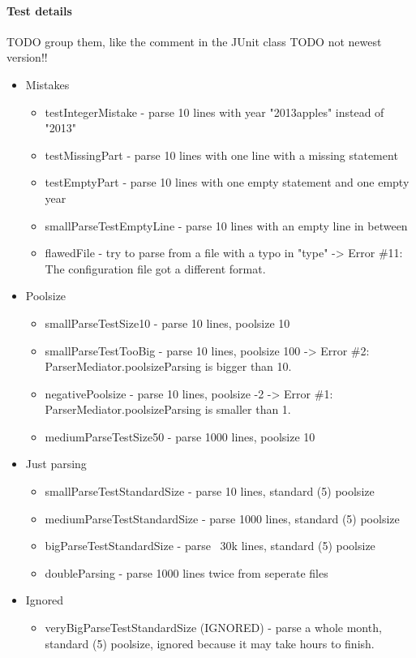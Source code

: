\paragraph{Test details}
TODO group them, like the comment in the JUnit class
TODO not newest version!!
\begin{itemize}

\item Mistakes 
\begin{itemize}
\item testIntegerMistake - parse 10 lines with year "2013apples" instead of "2013"
\item testMissingPart - parse 10 lines with one line with a missing statement
\item testEmptyPart - parse 10 lines with one empty statement and one empty year
\item smallParseTestEmptyLine - parse 10 lines with an empty line in between
\item flawedFile - try to parse from a file with a typo in "type" -> Error \#11: The configuration file got a different format.
\end{itemize}

\item Poolsize
\begin{itemize}
\item smallParseTestSize10 - parse 10 lines, poolsize 10
\item smallParseTestTooBig - parse 10 lines, poolsize 100 -> Error \#2: ParserMediator.poolsizeParsing is bigger than 10.
\item negativePoolsize - parse 10 lines, poolsize -2 -> Error \#1: ParserMediator.poolsizeParsing is smaller than 1.
\item mediumParseTestSize50 - parse 1000 lines, poolsize 10
\end{itemize}

\item Just parsing
\begin{itemize}
\item smallParseTestStandardSize - parse 10 lines, standard (5) poolsize
\item mediumParseTestStandardSize - parse 1000 lines, standard (5) poolsize
\item bigParseTestStandardSize - parse ~30k lines, standard (5) poolsize
\item doubleParsing - parse 1000 lines twice from seperate files
\end{itemize}

\item Ignored
\begin{itemize}
\item veryBigParseTestStandardSize (IGNORED) - parse a whole month, standard (5) poolsize, ignored because it may take hours 
to finish.
\end{itemize}

\end{itemize}

